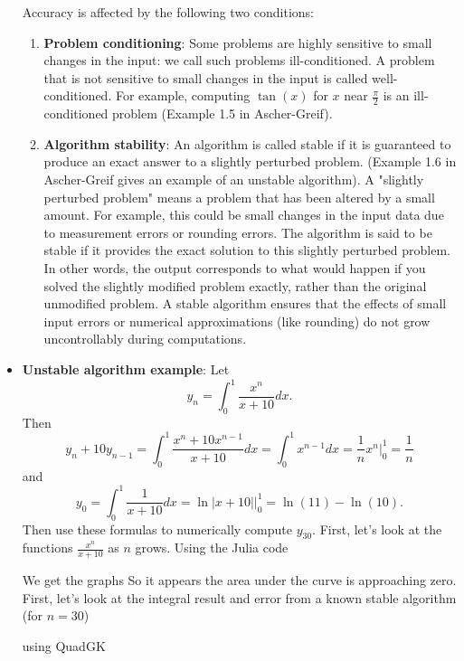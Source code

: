 \documentclass{report}
\begin{document}
\begin{itemize}
            Accuracy is affected by the following two conditions:
            \begin{enumerate}
                \item \textbf{Problem conditioning}: Some problems are highly sensitive to small changes in the input: we call such problems ill-conditioned. A problem that is not sensitive to small changes in the input is called well-conditioned. For example, computing $\tan(x)$ for $x$ near $\frac{\pi}{2} $ is an ill-conditioned problem (Example 1.5 in Ascher-Greif).
                \item \textbf{Algorithm stability}: An algorithm is called stable if it is guaranteed to produce an exact answer to a slightly perturbed problem. (Example 1.6 in Ascher-Greif gives an example of an unstable algorithm).
                    \bigbreak \noindent 
                    A "slightly perturbed problem" means a problem that has been altered by a small amount. For example, this could be small changes in the input data due to measurement errors or rounding errors.
                    \bigbreak \noindent 
                    The algorithm is said to be stable if it provides the exact solution to this slightly perturbed problem. In other words, the output corresponds to what would happen if you solved the slightly modified problem exactly, rather than the original unmodified problem.
                    \bigbreak \noindent 
                    A stable algorithm ensures that the effects of small input errors or numerical approximations (like rounding) do not grow uncontrollably during computations.

            \end{enumerate}
        \item \textbf{Unstable algorithm example}: Let 
            $$ y_n = \int_0^1 \frac{x^n}{x + 10} dx. $$
            Then 
            $$
        y_n + 10y_{n-1} = \int_0^1 \frac{x^n + 10x^{n-1}}{x + 10} dx = \int_0^1 x^{n-1} dx = \frac{1}{n}x^n \Big\rvert_0^1 = \frac1n
        $$
        and
        $$
    y_0 = \int_0^1 \frac{1}{x + 10} dx = \ln|x+10| \Big\rvert_0^1 = \ln(11) - \ln(10).
    $$
    Then use these formulas to numerically compute $y_{30}$.
    \bigbreak \noindent 
    First, let's look at the functions $\frac{x^{n}}{x+10}$ as $n$ grows. Using the Julia code
    \bigbreak \noindent 
    We get the graphs
    \bigbreak \noindent 
    \bigbreak \noindent 
    So it appears the area under the curve is approaching zero. First, let's look at the integral result and error from a known stable algorithm (for $n=30$)
    \bigbreak \noindent 
    \begin{jlcode}
        using QuadGK


\end{jlcode}
\end{itemize}
\end{document}
